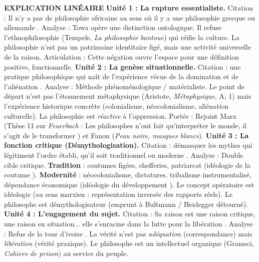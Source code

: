 \documentclass[11pt]{article}
\newcommand{\cle}[1]{{\popxbold\color{popdark}#1}}
\begin{document}
\begin{exoresolu}
\textbf{EXPLICATION LINÉAIRE}
\textbf{Unité 1 : La rupture essentialiste.} Citation : \guillemotleft Il n'y a pas de philosophie africaine au sens où il y a une philosophie grecque ou allemande \guillemotright. Analyse : Towa opère une \cle{distinction ontologique}. Il refuse l'ethnophilosophie (Tempels, \emph{La philosophie bantoue}) qui réifie la culture. La philosophie n'est pas un \guillemotleft patrimoine \guillemotright identitaire figé, mais une activité universelle de la raison. Articulation : Cette négation ouvre l'espace pour une définition positive, fonctionnelle.
\textbf{Unité 2 : La genèse situationnelle.} Citation : \guillemotleft une pratique philosophique qui naît de l'expérience vécue de la domination et de l'aliénation \guillemotright. Analyse : \cle{Méthode phénoménologique / matérialiste}. Le point de départ n'est pas l'étonnement métaphysique (Aristote, \emph{Métaphysique}, A, 1) mais l'\cle{expérience historique concrète} (colonialisme, néocolonialisme, aliénation culturelle). La philosophie est \emph{réactive} à l'oppression. Portée : Rejoint \cle{Marx} (Thèse 11 sur \emph{Feuerbach} : \guillemotleft Les philosophes n'ont fait qu'interpréter le monde, il s'agit de le transformer \guillemotright) et \cle{Fanon} (\emph{Peau noire, masques blancs}).
\textbf{Unité 3 : La fonction critique (Démythologisation).} Citation : \guillemotleft démasquer les mythes qui légitiment l'ordre établi, qu'il soit traditionnel ou moderne \guillemotright. Analyse : Double cible critique. \textbf{Tradition} : coutumes figées, chefferies, patriarcat (idéologie de la \guillemotleft coutume \guillemotright). \textbf{Modernité} : néocolonialisme, dictatures, tribalisme instrumentalisé, dépendance économique (idéologie du \guillemotleft développement \guillemotright). Le concept opératoire est \cle{idéologie} (au sens marxien : représentation inversée des rapports réels). Le philosophe est \guillemotleft démythologisateur \guillemotright (emprunt à Bultmann / Heidegger détourné).
\textbf{Unité 4 : L'engagement du sujet.} Citation : \guillemotleft Sa raison est une raison critique, une raison en situation... elle s'enracine dans la lutte pour la libération \guillemotright. Analyse : Refus de la \guillemotleft tour d'ivoire \guillemotright. La vérité n'est pas \emph{adéquation} (correspondance) mais \emph{libération} (vérité praxique). Le philosophe est un \cle{intellectuel organique} (Gramsci, \emph{Cahiers de prison}) au service du peuple.


\end{exoresolu}
\end{document}
